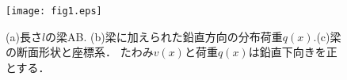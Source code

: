 \documentclass[10pt,a4j]{jarticle}
\begin{document}
\begin{figure}[h]
	\begin{center}
	\texttt{[image: fig1.eps]} 
	\end{center}
	\caption{(a)長さ$l$の梁AB. (b)梁に加えられた鉛直方向の分布荷重$q(x)$.(c)梁の断面形状と座標系．
        たわみ$v(x)$と荷重$q(x)$は鉛直下向きを正とする．}
	\label{fig:fig1}
\end{figure}
\end{document}
